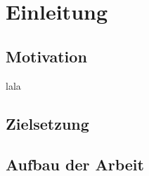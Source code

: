 \section{Einleitung}
\subsection{Motivation}
lala
\subsection{Zielsetzung}

\subsection{Aufbau der Arbeit}

